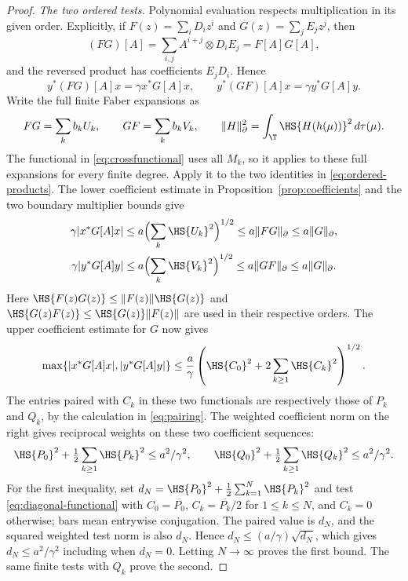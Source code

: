 \begin{proof}
\emph{The two ordered tests.}
Polynomial evaluation respects multiplication in its given order. Explicitly, if $F(z)=\sum_iD_iz^i$ and $G(z)=\sum_jE_jz^j$, then
\[
 (FG)[A]=\sum_{i,j}A^{i+j}\otimes D_iE_j=F[A]G[A],
\]
and the reversed product has coefficients $E_jD_i$. Hence
\begin{equation}\label{eq:ordered-products}
 y^*(FG)[A]x=\gamma x^*G[A]x,\qquad
 y^*(GF)[A]x=\gamma y^*G[A]y.
\end{equation}
Write the full finite Faber expansions as
\[
 FG=\sum_k b_kU_k,\qquad GF=\sum_k b_kV_k,
 \qquad \|H\|_\partial^2=\int_\T\HS{H(h(\mu))}^2\,d\tau(\mu).
\]
The functional in \eqref{eq:crossfunctional} uses all $M_k$, so it applies
to these full expansions for every finite degree. Apply it to the two
identities in \eqref{eq:ordered-products}. The lower coefficient estimate
in Proposition~\ref{prop:coefficients} and the two boundary multiplier
bounds give
\begin{align*}
 \gamma|x^*G[A]x|
 &\le a\Bigl(\sum_k\HS{U_k}^2\Bigr)^{1/2}
 \le a\|FG\|_\partial\le a\|G\|_\partial,\\
 \gamma|y^*G[A]y|
 &\le a\Bigl(\sum_k\HS{V_k}^2\Bigr)^{1/2}
 \le a\|GF\|_\partial\le a\|G\|_\partial.
\end{align*}
Here $\HS{F(z)G(z)}\le\|F(z)\|\HS{G(z)}$ and
$\HS{G(z)F(z)}\le\HS{G(z)}\|F(z)\|$ are used in their
respective orders. The upper coefficient estimate for $G$ now gives
\begin{equation}\label{eq:diagonal-functional}
 \max\{|x^*G[A]x|,|y^*G[A]y|\}
 \le\frac a\gamma
 \left(\HS{C_0}^2+2\sum_{k\ge1}\HS{C_k}^2\right)^{1/2}.
\end{equation}
The entries paired with $C_k$ in these two functionals are respectively those of $P_k$ and $Q_k$, by the calculation in \eqref{eq:pairing}. The weighted coefficient norm on the right gives reciprocal weights on these two coefficient sequences:
\begin{equation}\label{eq:weighted-dual}
 \HS{P_0}^2+\tfrac12\sum_{k\ge1}\HS{P_k}^2\le a^2/\gamma^2,
 \qquad
 \HS{Q_0}^2+\tfrac12\sum_{k\ge1}\HS{Q_k}^2\le a^2/\gamma^2.
\end{equation}
For the first inequality, set
$d_N=\HS{P_0}^2+\tfrac12\sum_{k=1}^N\HS{P_k}^2$
and test \eqref{eq:diagonal-functional} with $C_0=\overline{P_0}$,
$C_k=\overline{P_k}/2$ for $1\le k\le N$, and $C_k=0$ otherwise;
bars mean entrywise conjugation. The paired value is $d_N$, and the squared
weighted test norm is also $d_N$. Hence
$d_N\le(a/\gamma)\sqrt{d_N}$, which gives $d_N\le a^2/\gamma^2$
including when $d_N=0$. Letting $N\to\infty$ proves the first bound.
The same finite tests with $Q_k$ prove the second.


\end{proof}
